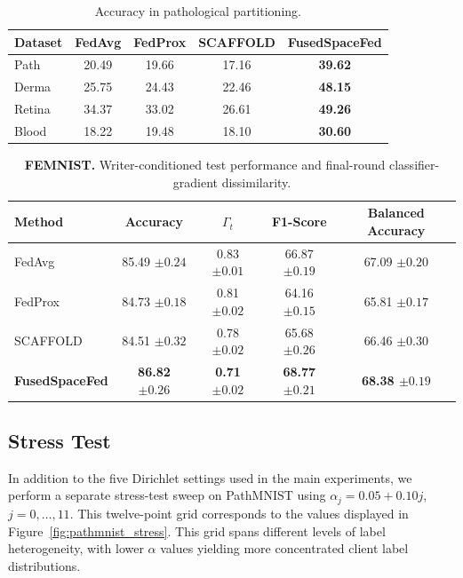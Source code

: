 \documentclass[twoside]{article}
\newif\ifcoauthorreview
\newcommand{\coauthordiffcolor}{\ifcoauthorreview\color[RGB]{0,70,140}\else\color[RGB]{0,0,0}\fi}
\theoremstyle{thmstyleone}%
\theoremstyle{thmstyletwo}%
\theoremstyle{thmstylethree}%
\begin{document}
\begin{table}[t]
\centering
\caption{Accuracy in pathological partitioning.}
\label{tab:pathological}
\small
\setlength{\tabcolsep}{2pt}
\begin{tabular}{@{}lcccc@{}}
\toprule
Dataset & FedAvg & FedProx & SCAFFOLD & \textbf{FusedSpaceFed} \\
\midrule
Path   & 20.49 & 19.66 & 17.16 & {\coauthordiffcolor\textbf{39.62}} \\
Derma  & 25.75 & 24.43 & 22.46 & \textbf{48.15} \\
Retina & 34.37 & 33.02 & 26.61 & \textbf{49.26} \\
Blood  & 18.22 & 19.48 & 18.10 & \textbf{30.60} \\
\bottomrule
\end{tabular}
\end{table}




\begin{table}[t]
\centering
\caption{\textbf{FEMNIST.} Writer-conditioned test performance and final-round classifier-gradient dissimilarity.}
\label{tab:femnist_results}
\begin{tabular}{lcccc}
\toprule
Method & Accuracy & $\Gamma_t$ & F1-Score & Balanced Accuracy \\
\midrule
FedAvg    & 85.49 $\pm 0.24$   & 0.83 $\pm 0.01$ & 66.87 $\pm 0.19$ & 67.09 $\pm 0.20$ \\
FedProx   & 84.73 $\pm 0.18$   & 0.81 $\pm 0.02$  & 64.16 $\pm 0.15$ & 65.81 $\pm 0.17$ \\
SCAFFOLD  & 84.51 $\pm 0.32$  & 0.78 $\pm 0.02$  & 65.68 $\pm 0.26$ & 66.46 $\pm 0.30$ \\
\textbf{FusedSpaceFed} & \textbf{86.82 $\pm 0.26$} & \textbf{0.71 $\pm 0.02$} & \textbf{68.77 $\pm 0.21$} & \textbf{68.38 $\pm 0.19$} \\
\bottomrule
\end{tabular}
\end{table}
\subsection{Stress Test}
In addition to the five Dirichlet settings used in the main experiments, we
perform a separate stress-test sweep on PathMNIST using
$\alpha_j=0.05+0.10j$, $j=0,\ldots,11$.
This twelve-point grid corresponds to the values displayed in
Figure~\ref{fig:pathmnist_stress}.
This grid spans different levels of label heterogeneity, with lower $\alpha$
values yielding more concentrated client label distributions.
\end{document}
